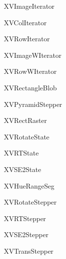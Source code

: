 \begin{CompactList}
\begin{CompactList}
\begin{CompactList}
\item {}
\begin{CompactList}
\item XVImage\-Iterator\begin{CompactList}
\item XVCol\-Iterator\item XVRow\-Iterator\end{CompactList}
\item XVImage\-WIterator\begin{CompactList}
\item XVRow\-WIterator\end{CompactList}
\end{CompactList}
\item XVRectangle\-Blob\end{CompactList}
\end{CompactList}
\item XVPyramid\-Stepper\item XVRect\-Raster\item XVRotate\-State\item XVRTState\item XVSE2State\item {}
\begin{CompactList}
\item XVHue\-Range\-Seg\item {}
\item {}
\item {}
\item {}
\end{CompactList}
\item {}
\begin{CompactList}
\item {}
\end{CompactList}
\item {}
\begin{CompactList}
\item XVRotate\-Stepper\item XVRTStepper\item XVSE2Stepper\item XVTrans\-Stepper\end{CompactList}

\end{CompactList}

